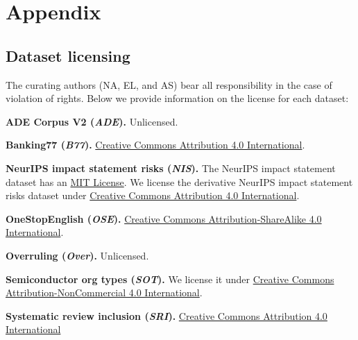 \documentclass{article}
\begin{document}
\fi




\newpage
\appendix

\section{Appendix}
\begin{comment}
Experiment details
Dataset details
    Textual labels
    Example (if not in body)
    Licenses
    Datasheets for new datasets, cite papers for other datasets
Human benchmark collection details
    Instructions given to humans
    Instructions given for each dataset
\end{comment}

\subsection{Dataset licensing}

The curating authors (NA, EL, and AS) bear all responsibility in the case of violation of rights. Below we provide information on the license for each dataset:

\textbf{ADE Corpus V2 (\textit{ADE}).} Unlicensed.


\textbf{Banking77 (\textit{B77}).} \href{https://github.com/PolyAI-LDN/task-specific-datasets/blob/master/LICENSE}{Creative Commons Attribution 4.0 International}.

\textbf{NeurIPS impact statement risks (\textit{NIS}).} The NeurIPS impact statement dataset has an \href{https://github.com/paulsedille/NeurIPS-Broader-Impact-Statements/blob/main/LICENSE}{MIT License}. We license the derivative NeurIPS impact statement risks dataset under \href{https://creativecommons.org/licenses/by/4.0/legalcode}{Creative Commons Attribution 4.0 International}.

\textbf{OneStopEnglish (\textit{OSE}).} \href{https://github.com/nishkalavallabhi/OneStopEnglishCorpus/blob/master/LICENSE.markdown}{Creative Commons Attribution-ShareAlike 4.0 International}.

\textbf{Overruling (\textit{Over}).} Unlicensed.


\textbf{Semiconductor org types (\textit{SOT}).} We license it under \href{https://creativecommons.org/licenses/by-nc/4.0/legalcode}{Creative Commons Attribution-NonCommercial 4.0 International}.

\textbf{Systematic review inclusion (\textit{SRI}).} \href{https://creativecommons.org/licenses/by-nc/4.0/legalcode}{Creative Commons Attribution 4.0 International}
\end{document}
